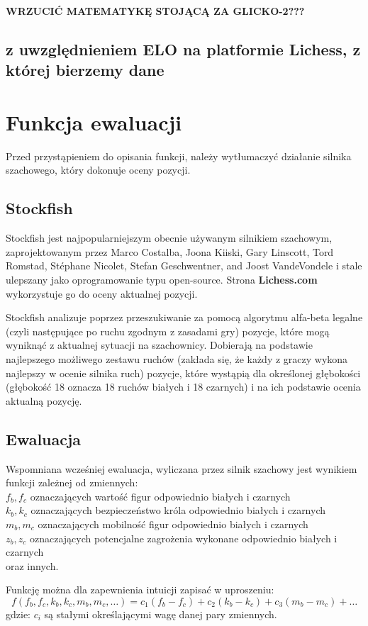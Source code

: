 \documentclass[inzynierska]{pwr_wmat_praca_dyplomowa}
\theoremstyle{plain}
\numberwithin{theorem}{chapter}
\theoremstyle{definition}
\numberwithin{theorem}{chapter}
\begin{document}
\textbf{WRZUCIĆ MATEMATYKĘ STOJĄCĄ ZA GLICKO-2???}
\subsection{z uwzględnieniem ELO na platformie Lichess, z której bierzemy dane}
\section{Funkcja ewaluacji}
Przed przystąpieniem do opisania funkcji, należy wytłumaczyć działanie silnika szachowego, który dokonuje oceny pozycji.
\subsection{Stockfish}
Stockfish jest najpopularniejszym obecnie używanym silnikiem szachowym, zaprojektowanym przez Marco Costalba, Joona Kiiski, Gary Linscott, Tord Romstad, Stéphane Nicolet, Stefan Geschwentner, and Joost VandeVondele i stale ulepszany jako oprogramowanie typu open-source. Strona \textbf{Lichess.com}\cite{stockfish_lichess} wykorzystuje go do oceny aktualnej pozycji.

Stockfish analizuje poprzez przeszukiwanie za pomocą algorytmu alfa-beta legalne (czyli następujące po ruchu zgodnym z zasadami gry) pozycje, które mogą wyniknąć z aktualnej sytuacji na szachownicy. Dobierają na podstawie najlepszego możliwego zestawu ruchów (zakłada się, że każdy z graczy wykona najlepszy w ocenie silnika ruch) pozycje, które wystąpią dla określonej głębokości (głębokość 18 oznacza 18 ruchów białych i 18 czarnych) i na ich podstawie ocenia aktualną pozycję.

\subsection{Ewaluacja}
Wspomniana wcześniej ewaluacja, wyliczana przez silnik szachowy jest wynikiem funkcji
zależnej od zmiennych:\\
$f_b,f_c$ oznaczających wartość figur odpowiednio białych i czarnych\\
$k_b,k_c$ oznaczających bezpieczeństwo króla odpowiednio białych i czarnych\\
$m_b,m_c$ oznaczających mobilność figur odpowiednio białych i czarnych\\
$z_b,z_c$ oznaczających potencjalne zagrożenia wykonane odpowiednio białych i czarnych\\
oraz innych.

Funkcję można dla zapewnienia intuicji zapisać w uproszeniu:
\begin{equation}
	f(f_b,f_c,k_b,k_c,m_b,m_c,\dots)=c_1(f_b-f_c)+c_2(k_b-k_c)+c_3(m_b-m_c)+\dots
\end{equation}
gdzie:
$c_i$ są stałymi określającymi wagę danej pary zmiennych.
\end{document}
